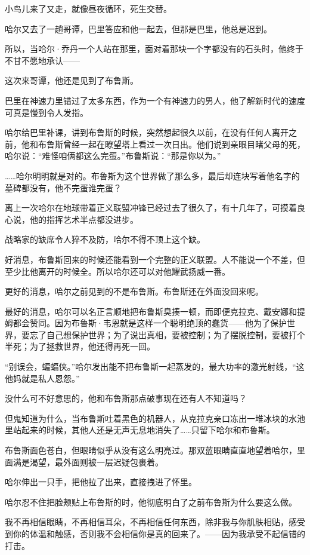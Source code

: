 \documentclass[../main]{subfiles}
\begin{document}
小鸟儿来了又走，就像昼夜循环，死生交替。

哈尔又去了一趟哥谭，巴里答应和他一起去，但那是巴里，他总是迟到。

所以，当哈尔·乔丹一个人站在那里，面对着那块一个字都没有的石头时，他终于不甘不愿地承认——

这次来哥谭，他还是见到了布鲁斯。

巴里在神速力里错过了太多东西，作为一个有神速力的男人，他了解新时代的速度可真是慢到令人发指。

哈尔给巴里补课，讲到布鲁斯的时候，突然想起很久以前，在没有任何人离开之前，他和布鲁斯曾经一起在瞭望塔上看过一次日出。他们说到亲眼目睹父母的死，哈尔说：“难怪咱俩都这么完蛋。”布鲁斯说：“那是你以为。”

……哈尔明明就是对的。布鲁斯为这个世界做了那么多，最后却连块写着他名字的墓碑都没有，他不完蛋谁完蛋？

离上一次哈尔在地球带着正义联盟冲锋已经过去了很久了，有十几年了，可摸着良心说，他的指挥艺术半点都没进步。

战略家的缺席令人猝不及防，哈尔不得不顶上这个缺。

好消息，布鲁斯回来的时候还能看到一个完整的正义联盟。人不能说一个不差，但至少比他离开的时候全。所以哈尔还可以对他耀武扬威一番。

更好的消息，哈尔之前见到的不是布鲁斯。布鲁斯还在外面没回来呢。

最好的消息，哈尔可以名正言顺地把布鲁斯臭揍一顿，而即便克拉克、戴安娜和提姆都会赞同。因为布鲁斯·韦恩就是这样一个聪明绝顶的蠢货——他为了保护世界，要忘了自己想保护世界；为了说出真相，要被控制；为了摆脱控制，要被打个半死；为了拯救世界，他还得再死一回。

“别误会，蝙蝠侠。”哈尔发出能不把布鲁斯一起蒸发的，最大功率的激光射线，“这他妈就是私人恩怨。”

没什么可不好意思的，他和布鲁斯那点破事现在还有人不知道吗？

但鬼知道为什么，当布鲁斯吐着黑色的机器人，从克拉克亲口冻出一堆冰块的水池里站起来的时候，其他人还是无声无息地消失了……只留下哈尔和布鲁斯。

布鲁斯面色苍白，但眼睛似乎从没有这么明亮过。那双蓝眼睛直直地望着哈尔，里面满是渴望，最外面则被一层迟疑包裹着。

哈尔伸出一只手，把他拉了出来，直接拽进了怀里。

哈尔忍不住把脸颊贴上布鲁斯的时，他彻底明白了之前布鲁斯为什么要这么做。

我不再相信眼睛，不再相信耳朵，不再相信任何东西，除非我与你肌肤相贴，感受到你的体温和触感，否则我不会相信你是真的回来了。——因为我承受不起信错的打击。
\end{document}
